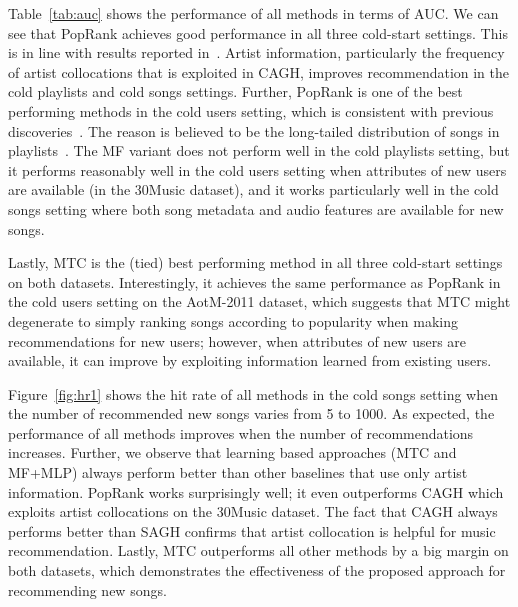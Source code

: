 Table~\ref{tab:auc} shows the performance of all methods in terms of AUC.
We can see that PopRank %
achieves good performance in all three cold-start settings.
This is in line with results reported in~\cite{bonnin2013evaluating,bonnin2015automated}.
Artist information, particularly the frequency of artist collocations that is exploited in CAGH, 
improves recommendation in the cold playlists and cold songs settings.
Further, PopRank is one of the best performing methods in the cold users setting,
which is consistent with previous discoveries~\cite{mcfee2012million,bonnin2013evaluating,bonnin2015automated}.
The reason is believed to be the long-tailed distribution of songs in
playlists~\cite{cremonesi2010performance,bonnin2013evaluating}.
%
The MF variant does not perform well in the cold playlists setting,
but it performs reasonably well in the cold users setting when attributes of new users are available
(\eg in the 30Music dataset),
and it works particularly well in the cold songs setting where both song metadata and audio features are available 
for new songs.

Lastly, 
MTC is the (tied) best performing method in all three cold-start settings on both datasets.
Interestingly, it achieves the same performance as PopRank in the cold users setting on the AotM-2011 dataset,
which suggests that MTC might degenerate to simply ranking songs according to popularity when making recommendations
for new users; however, when attributes of new users are available, %
it can improve 
by exploiting information learned from existing users.


Figure~\ref{fig:hr1} shows the hit rate of all methods in the cold songs setting
when the number of recommended new songs varies from 5 to 1000.
As expected, the performance of all methods improves when the number of recommendations increases.
Further, we observe that learning based approaches (\ie MTC and MF+MLP) always perform better than 
other baselines that use only artist information.
PopRank %
works surprisingly well;
it even outperforms CAGH which exploits artist collocations on the 30Music dataset.
The fact that CAGH always performs better than SAGH confirms that artist collocation is helpful
for music recommendation.
Lastly, MTC outperforms all other methods by a big margin on both datasets,
which demonstrates the effectiveness of the proposed approach for recommending new songs.


